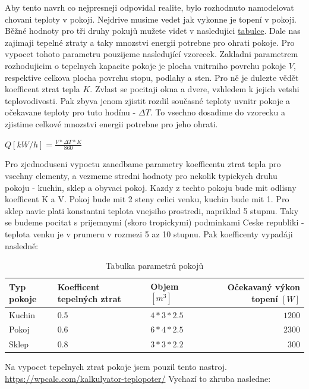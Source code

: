 Aby tento navrh co nejpresneji odpovidal realite, bylo rozhodnuto namodelovat chovani teploty v pokoji.
Nejdrive musime vedet jak vykonne je topení v pokoji. Běžné hodnoty pro tři druhy pokujů mužete videt v nasledujici \hyperref[tab:TepelneZtraty]{tabulce}. Dale nas zajimaji tepelné ztraty a taky mnozstvi energii potrebne pro ohrati pokoje. Pro vypocet tohoto parametru pouzijeme nasledující vzorecek. Zakladni parametrem rozhodujicim o tepelnych kapacite pokoje je plocha vnitrniho povrchu pokoje $V$, respektive celkova plocha povrchu stopu, podlahy a sten. Pro ně je dulezte vědět koefficent ztrat tepla $K$. Zvlast se pocitaji okna a dvere, vzhledem k jejich vetshi teplovodivosti. Pak zbyva jenom zjistit rozdil současné teploty uvnitr pokoje a očekavane teploty pro tuto hodínu - $\Delta{T}$. To vsechno dosadime do vzorecku a zjistime celkové mnozstvi energii potrebne pro jeho ohrati. \cite{tep_calc}
\begin{center}
  $Q[kW/h] = \frac{V*\Delta{T}*K}{860}$
\end{center}

Pro zjednoduseni vypoctu zanedbame parametry koefficentu ztrat tepla pro vsechny elementy, a vezmeme stredni hodnoty pro nekolik typickych druhu pokoju - kuchin, sklep a obyvaci pokoj. Kazdy z techto pokoju bude mit odlisny koefficent K a V. Pokoj bude mit 2 steny celici venku, kuchin bude mit 1. Pro sklep navic plati konstantni teplota vnejsiho prostredi, napriklad 5 stupnu. Taky se budeme pocitat s prijemnymi (skoro tropickymi) podminkami Ceske republiki - teplota venku je v prumeru v rozmezi 5 az 10 stupnu. \cite{cesko}
Pak koefficenty vypadáji nasledně:

\begin{table}[H]
	\vskip6pt
	\caption{Tabulka parametrů pokojů}
    \vskip6pt
	\centering
	\begin{tabular}{lllr}
		\toprule
		Typ pokoje & Koefficent tepelných ztrat & Objem $[m^3]$ & Očekavaný výkon topení $[W]$ \\
    \midrule
    Kuchin & 0.5 & $4*3*2.5$ & $1200$ \\
    Pokoj & 0.6 & $6*4*2.5$ & $2300$ \\
    Sklep & 0.8 & $3*3*2.2$ & $300$ \\
		\bottomrule
	\end{tabular}
	\label{tab:Parametry}
\end{table}

Na vypocet tepelnych ztrat pokoje jsem pouzil tento nastroj. \url{https://wpcalc.com/kalkulyator-teplopoter/}
Vychazí to zhruba nasledne:

